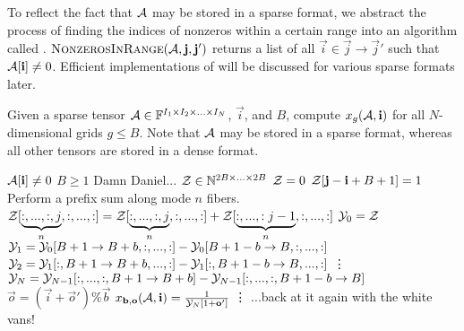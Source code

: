     To reflect the fact that $\mathbf{\mathcal{A}}$ may be stored in a sparse format, we abstract the process of finding the indices of nonzeros within a certain range into an algorithm called . $\textproc{NonzerosInRange}(\Ten{A}, \vec{j}, \vec{j}')$ returns a list of all $\vec{i} \in \vec{j} \to \vec{j}'$ such that $\mathbf{\mathcal{A}}[\mathbf{i}] \neq 0$. Efficient implementations of  will be discussed for various sparse formats later.

    \begin{samepage}
    \begin{alg}
      Given a sparse tensor $\mathbf{\mathcal{A}} \in \mathbb{F}^{I_1 \times I_2 \times ... \times I_N}$, $\vec{i}$, and $B$, compute $x_g(\mathbf{\mathcal{A}}, \mathbf{i})$ for all $N$-dimensional grids $g \leq B$. Note that $\mathbf{\mathcal{A}}$ may be stored in a sparse format, whereas all other tensors are stored in a dense format.
      \begin{algorithmic}[1]
        \Require
        \Statex $\mathbf{\mathcal{A}}[\mathbf{i}] \neq 0$
        \Statex $B \geq 1$
        \Statex Damn Daniel...
          \State $\mathbf{\mathcal{Z}} \in \mathbb{N}^{2B \times ... \times 2B}$
          \State $\mathbf{\mathcal{Z}} = 0$
           \label{alg:depositrestricted:loop}
            \State $\mathbf{\mathcal{Z}}[\mathbf{j} - \mathbf{i} + B + 1] = 1$
          \EndFor
              \Comment Perform a prefix sum along mode $n$ fibers.
              \State $\mathbf{\mathcal{Z}}[\underbrace{:,...,:,j}_{n}, :, ..., :] = \mathbf{\mathcal{Z}}[\underbrace{:,...,:,j}_{n}, :, ..., :] + \mathbf{\mathcal{Z}}[\underbrace{:,...,:j - 1}_{n}, :, ..., :]$
            \EndFor
          \EndFor
          \State $\mathbf{\mathcal{Y}}_0 = \mathbf{\mathcal{Z}}$
            \State $\mathbf{\mathcal{Y}}_1 = \mathbf{\mathcal{Y}}_0[B + 1 \to B + b, :, ..., :] - \mathbf{\mathcal{Y}}_0[B + 1 - b \to B, :, ..., :]$
              \State $\mathbf{\mathcal{Y}}_2 = \mathbf{\mathcal{Y}}_1[:, B + 1 \to B + b, ..., :] - \mathbf{\mathcal{Y}}_1[:, B + 1 - b \to B, ..., :]$
              \Statex \vdots\nopagebreak
                \State $\mathbf{\mathcal{Y}}_N = \mathbf{\mathcal{Y}}_{N - 1}[:, ..., :, B + 1 \to B + b] - \mathbf{\mathcal{Y}}_{N - 1}[:, ..., :, B + 1 - b \to B]$
                  \State $\vec{o} = (\vec{i} + \vec{o}') \% \vec{b}$
                  \State $x_{\mathbf{b}, \mathbf{o}}(\mathbf{\mathcal{A}}, \mathbf{i}) = \frac{1}{\mathbf{\mathcal{Y}}_N[1 + \mathbf{o}']}$
                \EndFor
              \EndFor
              \Statex \vdots\nopagebreak
            \EndFor
          \EndFor
        \EndFunction
        \Ensure
        \Statex ...back at it again with the white vans!
      \end{algorithmic}
      \label{alg:sample}
    \end{alg}
    \end{samepage}
